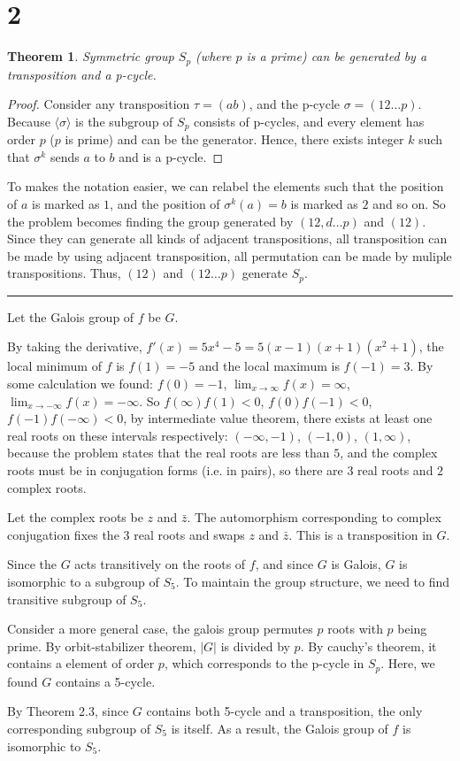 \documentclass{article}
\newtheorem{theorem}{Theorem}[section]
\theoremstyle{definition}
\theoremstyle{remark}
\begin{document}
\section*{2}
\begin{theorem}
Symmetric group $S_p$ (where $p$ is a prime) can be generated by a transposition and a p-cycle.
\end{theorem}
\begin{proof}
Consider any transposition $\tau=(ab)$, and the p-cycle $\sigma=(12\dots p)$. Because $\langle \sigma\rangle$ is the subgroup of $S_p$ consists of p-cycles, and every element has order $p$ ($p$ is prime) and can be the generator. Hence, there exists integer $k$ such that $\sigma^k$ sends $a$ to $b$ and is a p-cycle.
\end{proof}
To makes the notation easier, we can relabel the elements such that the position of $a$ is marked as $1$, and the position of $\sigma^k(a)=b$ is marked as $2$ and so on. So the problem becomes finding the group generated by $(12,d\dots p)$ and $(12)$. Since they can generate all kinds of adjacent transpositions, all transposition can be made by using adjacent transposition, all permutation can be made by muliple transpositions. Thus, $(12)$ and $(12\dots p)$ generate $S_p$.
\par\noindent\rule{\textwidth}{0.4pt}
Let the Galois group of $f$ be $G$.

By taking the derivative, $f'(x)=5x^4-5=5(x-1)(x+1)(x^2+1)$, the local minimum of $f$ is $f(1)=-5$ and the local maximum is $f(-1)=3$. By some calculation we found: $f(0)=-1$, $\displaystyle{\lim_{x\rightarrow \infty}f(x)=\infty}$, $\displaystyle{\lim_{x\rightarrow -\infty}f(x)=-\infty}$. So $f(\infty)f(1)<0$, $f(0)f(-1)<0$, $f(-1)f(-\infty)<0$, by intermediate value theorem, there exists at least one real roots on these intervals respectively: $(-\infty, -1)$, $(-1, 0)$, $(1, \infty)$, because the problem states that the real roots are less than $5$, and the complex roots must be in conjugation forms (i.e. in pairs), so there are $3$ real roots and $2$ complex roots.

Let the complex roots be $z$ and $\bar{z}$. The automorphism corresponding to complex conjugation fixes the $3$ real roots and swaps $z$ and $\bar{z}$. This is a transposition in $G$.

Since the $G$ acts transitively on the roots of $f$, and since $G$ is Galois, $G$ is isomorphic to a subgroup of $S_5$. To maintain the group structure, we need to find transitive subgroup of $S_5$.

Consider a more general case, the galois group permutes $p$ roots with $p$ being prime. By orbit-stabilizer theorem, $|G|$ is divided by $p$. By cauchy's theorem, it contains a element of order $p$, which corresponds to the p-cycle in $S_p$. Here, we found $G$ contains a 5-cycle.

By Theorem 2.3, since $G$ contains both 5-cycle and a transposition, the only corresponding subgroup of $S_5$ is itself. As a result, the Galois group of $f$ is isomorphic to $S_5$.
\end{document}
